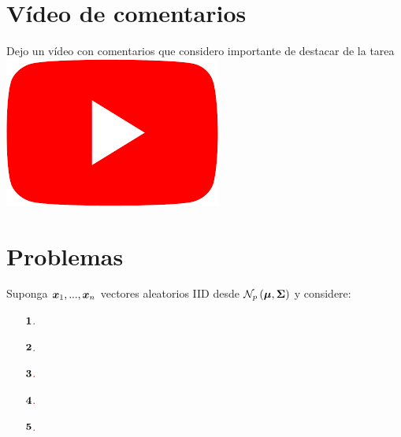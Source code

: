 \section*{Vídeo de comentarios}
Dejo un vídeo con comentarios que considero importante de destacar de la tarea \href{https://youtu.be/WzWKVBn8li4}{\includegraphics[scale=0.035]{Youtube_logo.png}}
\section*{Problemas}
Suponga $\bf{x}_1, . . . , \bf{x}_n$ vectores aleatorios IID desde $\mathcal{N}_p\left(\bf{\mu}, \bf{\Sigma}\right)$ y considere:
\begin{itemize}
\item[\textcolor{red}{$\bf{1}$.}]


\item[\textcolor{red}{$\bf{2}$.}]


\item[\textcolor{red}{$\bf{3}$.}]


\item[\textcolor{red}{$\bf{4}$.}]


\item[\textcolor{red}{$\bf{5}$.}]


\end{itemize}
